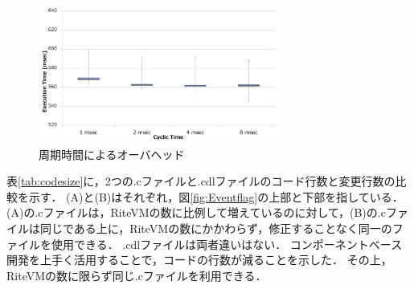 \documentclass[submit,techrep]{ipsj}
\begin{document}

\begin{figure}[t]
    \centering
    \includegraphics[width=8cm,clip]{../EMSOFT2016/figure/comparison_msec.pdf}
    \vspace{-2mm}
    \caption{周期時間によるオーバヘッド}
\vspace{-3mm}
    \label{fig:comparison_msec}
\end{figure}

表\ref{tab:codesize}に，2つの.cファイルと.cdlファイルのコード行数と変更行数の比較を示す．
(A)と(B)はそれぞれ，図\ref{fig:Eventflag}の上部と下部を指している．
(A)の.cファイルは，RiteVMの数に比例して増えているのに対して，(B)の.cファイルは同じである上に，RiteVMの数にかかわらず，修正することなく同一のファイルを使用できる．
.cdlファイルは両者違いはない．
コンポーネントベース開発を上手く活用することで，コードの行数が減ることを示した．%
その上，RiteVMの数に限らず同じ.cファイルを利用できる．%

\end{document}
